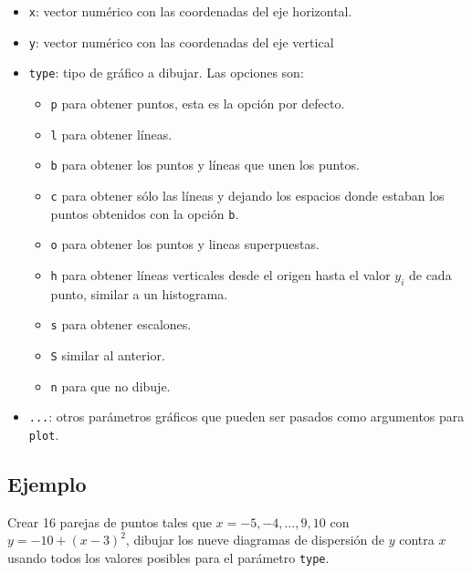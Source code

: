 \documentclass[10pt,]{krantz}
\providecommand{\tightlist}{%
  \setlength{\itemsep}{0pt}\setlength{\parskip}{0pt}}
\begin{document}
\begin{itemize}
\tightlist
\item
  \texttt{x}: vector numérico con las coordenadas del eje horizontal.
\item
  \texttt{y}: vector numérico con las coordenadas del eje vertical
\item
  \texttt{type}: tipo de gráfico a dibujar. Las opciones son:

  \begin{itemize}
  \tightlist
  \item
    \texttt{\textquotesingle{}p\textquotesingle{}} para obtener puntos,
    esta es la opción por defecto.
  \item
    \texttt{\textquotesingle{}l\textquotesingle{}} para obtener líneas.
  \item
    \texttt{\textquotesingle{}b\textquotesingle{}} para obtener los
    puntos y líneas que unen los puntos.
  \item
    \texttt{\textquotesingle{}c\textquotesingle{}} para obtener sólo las
    líneas y dejando los espacios donde estaban los puntos obtenidos con
    la opción \texttt{\textquotesingle{}b\textquotesingle{}}.
  \item
    \texttt{\textquotesingle{}o\textquotesingle{}} para obtener los
    puntos y lineas superpuestas.
  \item
    \texttt{\textquotesingle{}h\textquotesingle{}} para obtener líneas
    verticales desde el origen hasta el valor \(y_i\) de cada punto,
    similar a un histograma.
  \item
    \texttt{\textquotesingle{}s\textquotesingle{}} para obtener
    escalones.
  \item
    \texttt{\textquotesingle{}S\textquotesingle{}} similar al anterior.
  \item
    \texttt{\textquotesingle{}n\textquotesingle{}} para que no dibuje.
  \end{itemize}
\item
  \texttt{...}: otros parámetros gráficos que pueden ser pasados como
  argumentos para \texttt{plot}.
\end{itemize}

\subsection*{Ejemplo}\label{ejemplo-8}


Crear 16 parejas de puntos tales que \(x=-5, -4, \ldots, 9, 10\) con
\(y=-10+(x-3)^2\), dibujar los nueve diagramas de dispersión de \(y\)
contra \(x\) usando todos los valores posibles para el parámetro
\texttt{type}.
\end{document}
